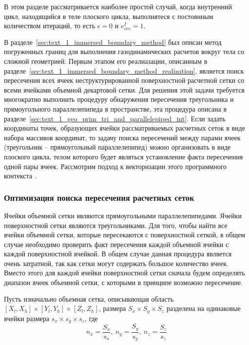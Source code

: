В этом разделе рассматривается наиболее простой случай, когда внутренний цикл, находящийся в теле плоского цикла, выполнятеся с постоянным количеством итераций, то есть $\epsilon = 0$ и $e_{vec}^I = 1$.

В разделе~\ref{sec:text_1_immersed_boundary_method} был описан метод погруженных границ для выполнения газодинамических расчетов вокруг тела со сложной геометрией.
Первым этапом его реалиазации, описанным в разделе~\ref{sec:text_1_immersed_boundary_method_realization}, является поиск пересечения всех ячеек неструктурированной поверхностной расчетной сетки со всеми ячейками объемной декартовой сетки.
Для решения этой задачи требуется многократно выполнить процедуру обнаружения пересечения треугольника и прямоугольного параллелепипеда в пространстве, эта процедура описана в разделе~\ref{sec:text_1_geo_prim_tri_and_parallelepiped_int}.
Если задать координаты точек, образующих ячейки рассматриваемых расчетных сеток в виде набора массивов координат, то задачу поиска пересечений между парами ячеек (треугольник -- прямоугольный параллелепипед) можно организовать в виде плоского цикла, телом которого будет являться установление факта пересечения одной пары ячеек.
Рассмотрим подход к векторизации этого программного контекста \cite{Rybakov2019VecInt}.

\subsubsection{Оптимизация поиска пересечения расчетных сеток}

Ячейки объемной сетки являются прямоугольными параллелепипедами.
Ячейки поверхностной сетки являются треугольниками.
Для того, чтобы найти все ячейки объемной сетки, которые пересекаются с поверхностной сеткой, в общем случае необходимо проверить факт пересечения каждой объемной ячейки с каждой поверхностной ячейкой.
В общем случае данная процедура является очень затратной, так как сетки могут содержать большое количество ячеек.
Вместо этого для каждой ячейки поверхностной сетки сначала будем определять диапазон ячеек объемной сетки, с которыми в принципе возможно пересечение.

Пусть изначально объемная сетка, описывающая область $[X_l, X_h] \times [Y_l, Y_h] \times [Z_l, Z_h]$, размера $S_x \times S_y \times S_z$ разделена на одинаковые ячейки размера $s_x \times s_y \times s_z$, где
\begin{equation}
	n_x = \frac{S_x}{s_x}, \ n_y = \frac{S_y}{s_y}, \ n_z = \frac{S_z}{s_z}
\end{equation}

